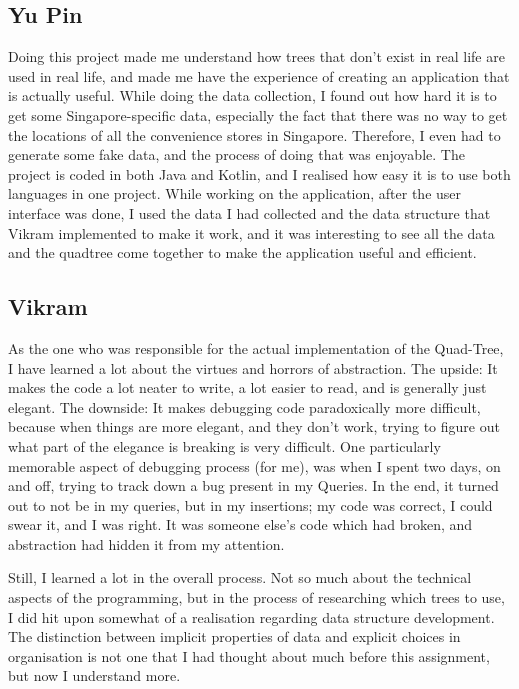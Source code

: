 \documentclass[12pt]{article}
\begin{document}
{\subsection{Yu Pin}

Doing this project made me understand how trees that don't exist in real life are used in real life, and made me have the experience of creating an application that is actually useful. While doing the data collection, I found out how hard it is to get some Singapore-specific data, especially the fact that there was no way to get the locations of all the convenience stores in Singapore. Therefore, I even had to generate some fake data, and the process of doing that was enjoyable. The project is coded in both Java and Kotlin, and I realised how easy it is to use both languages in one project. While working on the application, after the user interface was done, I used the data I had collected and the data structure that Vikram implemented to make it work, and it was interesting to see all the data and the quadtree come together to make the application useful and efficient.

\subsection{Vikram}

As the one who was responsible for the actual implementation of the Quad-Tree, I have learned a lot about the virtues and horrors of abstraction. The upside: It makes the code a lot neater to write, a lot easier to read, and is generally just elegant. The downside: It makes debugging code paradoxically more difficult, because when things are more elegant, and they don't work, trying to figure out what part of the elegance is breaking is very difficult. One particularly memorable aspect of debugging process (for me), was when I spent two days, on and off, trying to track down a bug present in my Queries. In the end, it turned out to not be in my queries, but in my insertions; my code was correct, I could swear it, and I was right. It was someone else's code which had broken, and abstraction had hidden it from my attention.

Still, I learned a lot in the overall process. Not so much about the technical aspects of the programming, but in the process of researching which trees to use, I did hit upon somewhat of a realisation regarding data structure development. The distinction between implicit properties of data and explicit choices in organisation is not one that I had thought about much before this assignment, but now I understand more.

}
\end{document}
